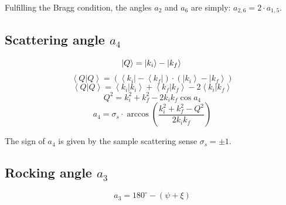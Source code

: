 Fulfilling the Bragg condition, the angles $a_2$ and $a_6$ are simply: $a_{2,6} = 2 \cdot a_{1,5}.$



\subsection*{Scattering angle $a_4$}

\begin{equation} 
	\left| Q \right> = \left| k_i \right> - \left| k_f \right> \\ 
\end{equation}
\begin{equation} 
	\left< Q | Q \right> = \left( \left< k_i \right| - \left< k_f \right| \right) \cdot \left( \left| k_i \right> - \left| k_f \right> \right)
\end{equation}
\begin{equation} 
	\left< Q | Q \right> = \left< k_i | k_i \right> + \left< k_f | k_f \right> - 2 \left< k_i | k_f \right> 
\end{equation}
\begin{equation} 
	Q^2 = k_i^2 + k_f^2 - 2 k_i k_f \cos a_4 
\end{equation}
\begin{equation}
	\boxed{ a_4 = \sigma_s \cdot \arccos \left( \frac{k_i^2 + k_f^2 - Q^2}{2 k_i k_f} \right) } 
\end{equation}

The sign of $a_4$ is given by the sample scattering sense $\sigma_s = \pm 1$.




\subsection*{Rocking angle $a_3$}

\begin{equation} \boxed{ a_3 = 180^{\circ} - \left( \psi + \xi \right) } \end{equation}


